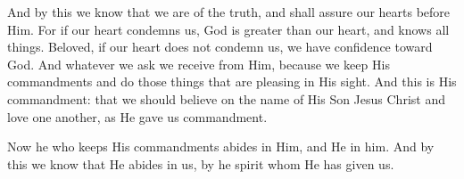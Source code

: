 \bverse And by this we know that we are of the truth, and shall assure our hearts before Him.
\bverse For if our heart condemns us, God is greater than our heart, and knows all things.
\bverse Beloved, if our heart does not condemn us, we have confidence toward God.
\bverse And whatever we ask we receive from Him, because we keep His commandments and do those things that are pleasing in His sight.
\bverse And this is His commandment: that we should believe on the name of His Son Jesus Christ and love one another, as He gave us commandment.


\bverse Now he who keeps His commandments abides in Him, and He in him. And by this we know that He abides in us, by he spirit whom He has given us.
